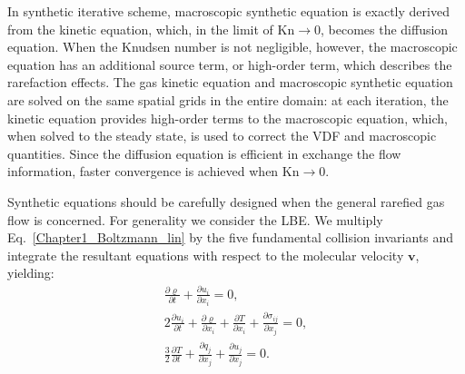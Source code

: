 


In synthetic iterative scheme, macroscopic synthetic equation is exactly derived from the kinetic equation, which, in the limit of $\text{Kn}\rightarrow0$, becomes the diffusion equation. When the Knudsen number is not negligible, however, the macroscopic equation has an additional source term, or high-order term, which describes the rarefaction effects. The gas kinetic equation and macroscopic synthetic equation are solved on the same spatial grids in the entire domain: at each iteration, the kinetic equation provides high-order terms to the macroscopic equation, which, when solved to the steady state, is used to correct the VDF and macroscopic quantities. Since the diffusion equation is efficient in exchange the flow information, faster convergence is achieved when $\text{Kn}\rightarrow0$. 



Synthetic equations should be carefully designed when the general rarefied gas flow is concerned. For generality  we consider the LBE. We multiply Eq.~\eqref{Chapter1_Boltzmann_lin}  by the five fundamental collision invariants and integrate the resultant equations with respect to the molecular velocity $\bm{v}$, yielding: 
\begin{equation}\label{eq123}
\begin{aligned}
\frac{\partial {\varrho}}{\partial{t}}+\frac{\partial {u_i}}{\partial{x_i}}=0, \\
2\frac{\partial {u_i}}{\partial{t}}+\frac{\partial {\varrho}}{\partial{x_i}}+\frac{\partial {T}}{\partial{x_i}}+\frac{\partial {{\sigma_{ij}}}}{\partial{x_j}}=0, \\
\frac{3}{2}\frac{\partial {T}}{\partial{t}}+\frac{\partial {{q_j}}}{\partial{x_j}}+\frac{\partial {u_j}}{\partial{x_j}}=0.
\end{aligned}
\end{equation}


